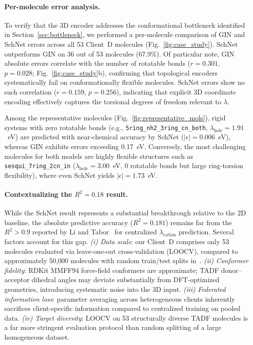 \documentclass[twocolumn]{article}
\newcommand{\lam}{\lambda}
\newcommand{\lamhole}{\lambda_{\text{hole}}}
\newcommand{\lamcat}{\lambda_{\text{cation}}}
\newcommand{\Rsq}{R^{2}}
\begin{document}
\paragraph{Per-molecule error analysis.}
To verify that the 3D encoder addresses the conformational bottleneck identified in Section~\ref{sec:bottleneck}, we performed a per-molecule comparison of GIN and SchNet errors across all 53 Client~D molecules (Fig.~\ref{fig:case_study}).
SchNet outperforms GIN on 36 out of 53 molecules (67.9\%).
Of particular note, GIN absolute errors correlate with the number of rotatable bonds ($r = 0.301$, $p = 0.028$; Fig.~\ref{fig:case_study}b), confirming that topological encoders systematically fail on conformationally flexible molecules.
SchNet errors show no such correlation ($r = 0.159$, $p = 0.256$), indicating that explicit 3D coordinate encoding effectively captures the torsional degrees of freedom relevant to $\lam$.

Among the representative molecules (Fig.~\ref{fig:representative_mols}), rigid systems with zero rotatable bonds (e.g., \texttt{5ring\_nh2\_3ring\_cn\_both}, $\lamhole = 1.91$~eV) are predicted with near-chemical accuracy by SchNet ($|\epsilon| = 0.006$~eV), whereas GIN exhibits errors exceeding 0.17~eV.
Conversely, the most challenging molecules for both models are highly flexible structures such as \texttt{sesqui\_7ring\_2cn\_in} ($\lamhole = 3.00$~eV, 0 rotatable bonds but large ring-torsion flexibility), where even SchNet yields $|\epsilon| = 1.73$~eV.

\paragraph{Contextualizing the $\Rsq = 0.18$ result.}
While the SchNet result represents a substantial breakthrough relative to the 2D baseline, the absolute predictive accuracy ($\Rsq = 0.181$) remains far from the $\Rsq > 0.9$ reported by Li and Tabor~\cite{Li2023_SchNet} for centralized $\lamcat$ prediction.
Several factors account for this gap.
\emph{(i) Data scale}: our Client~D comprises only 53 molecules evaluated via leave-one-out cross-validation (LOOCV), compared to approximately 50{,}000 molecules with random train/test splits in~\cite{Li2023_SchNet}.
\emph{(ii) Conformer fidelity}: RDKit MMFF94 force-field conformers are approximate; TADF donor--acceptor dihedral angles may deviate substantially from DFT-optimized geometries, introducing systematic noise into the 3D input.
\emph{(iii) Federated information loss}: parameter averaging across heterogeneous clients inherently sacrifices client-specific information compared to centralized training on pooled data.
\emph{(iv) Target diversity}: LOOCV on 53 structurally diverse TADF molecules is a far more stringent evaluation protocol than random splitting of a large homogeneous dataset.
\end{document}

